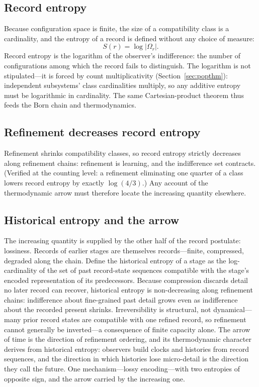 \documentclass[11pt]{article}
\theoremstyle{definition}
\theoremstyle{remark}
\begin{document}
\subsection{Record entropy}
Because configuration space is finite, the size of a compatibility class is a cardinality, and the entropy of a record is defined without any choice of measure:
\[ S(r) = \log |\Omega_r| . \]
Record entropy is the logarithm of the observer's indifference: the number of configurations among which the record fails to distinguish. The logarithm is not stipulated---it is forced by count multiplicativity (Section~\ref{sec:popthm}): independent subsystems' class cardinalities multiply, so any additive entropy must be logarithmic in cardinality. The same Cartesian-product theorem thus feeds the Born chain and thermodynamics.

\subsection{Refinement decreases record entropy}
Refinement shrinks compatibility classes, so record entropy strictly decreases along refinement chains: refinement is learning, and the indifference set contracts. (Verified at the counting level: a refinement eliminating one quarter of a class lowers record entropy by exactly $\log(4/3)$.) Any account of the thermodynamic arrow must therefore locate the increasing quantity elsewhere.

\subsection{Historical entropy and the arrow}
The increasing quantity is supplied by the other half of the record postulate: lossiness. Records of earlier stages are themselves records---finite, compressed, degraded along the chain. Define the historical entropy of a stage as the log-cardinality of the set of past record-state sequences compatible with the stage's encoded representation of its predecessors. Because compression discards detail no later record can recover, historical entropy is non-decreasing along refinement chains: indifference about fine-grained past detail grows even as indifference about the recorded present shrinks. Irreversibility is structural, not dynamical---many prior record states are compatible with one refined record, so refinement cannot generally be inverted---a consequence of finite capacity alone. The arrow of time is the direction of refinement ordering, and its thermodynamic character derives from historical entropy: observers build clocks and histories from record sequences, and the direction in which histories lose micro-detail is the direction they call the future. One mechanism---lossy encoding---with two entropies of opposite sign, and the arrow carried by the increasing one.
\end{document}

